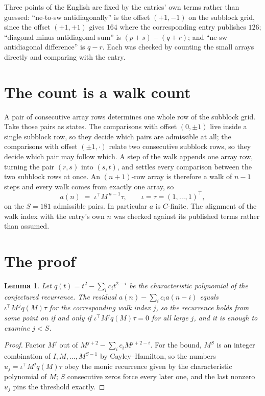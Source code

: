 \documentclass[11pt,a4paper]{article}
\theoremstyle{plain}
\newtheorem{lemma}[theorem]{Lemma}
\theoremstyle{definition}
\begin{document}
Three points of the English are fixed by the entries' own terms rather than guessed:
``ne-to-sw antidiagonally'' is the offset $(+1,-1)$ on the subblock grid, since the offset
$(+1,+1)$ gives $164$ where the corresponding entry publishes $126$; ``diagonal minus
antidiagonal sum'' is $(p+s)-(q+r)$; and ``ne-sw antidiagonal difference'' is $q-r$. Each was
checked by counting the small arrays directly and comparing with the entry.

\section{The count is a walk count}

A pair of consecutive array rows determines one whole row of the subblock grid. Take those
pairs as states. The comparisons with offset $(0,\pm1)$ live inside a single subblock row, so
they decide which pairs are admissible at all; the comparisons with offset $(\pm1,\cdot)$
relate two consecutive subblock rows, so they decide which pair may follow which. A step of the
walk appends one array row, turning the pair $(r,s)$ into $(s,t)$, and settles every comparison
between the two subblock rows at once. An $(n+1)$-row array is therefore a walk of $n-1$ steps
and every walk comes from exactly one array, so
\[
a(n)\;=\;\iota^{\!\top}M^{\,n-1}\tau,\qquad \iota=\tau=(1,\dots,1)^{\!\top},
\]
on the $S=181$ admissible pairs. In particular $a$ is $C$-finite. The alignment of the walk
index with the entry's own $n$ was checked against its published terms rather than assumed.

\section{The proof}

\begin{lemma}\label{lem:crit}
Let $q(t)=t^{2}-\sum_i c_it^{2-i}$ be the characteristic polynomial of the
conjectured recurrence. The residual $a(n)-\sum_ic_ia(n-i)$ equals
$\iota^{\!\top}M^{\,j}q(M)\tau$ for the corresponding walk index $j$, so the recurrence
holds from some point on if and only if $\iota^{\!\top}M^{j}q(M)\tau=0$ for all large $j$,
and it is enough to examine $j<S$.
\end{lemma}

\begin{proof}
Factor $M^{j}$ out of $M^{j+2}-\sum_ic_iM^{j+2-i}$. For the bound, $M^{S}$
is an integer combination of $I,M,\dots,M^{S-1}$ by Cayley--Hamilton, so the numbers
$u_j=\iota^{\!\top}M^{j}q(M)\tau$ obey the monic recurrence given by the characteristic
polynomial of $M$; $S$ consecutive zeros force every later one, and the last nonzero $u_j$
pins the threshold exactly.
\end{proof}
\end{document}
